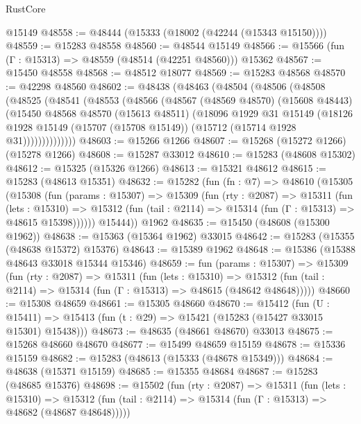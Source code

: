 \begin{lexlean}{RustCore}
\begin{coremodule}
    @15149
@48558 := @48444 (@15333 (@18002 (@42244 (@15343 @15150))))
@48559 := @15283 @48558
@48560 := @48544 @15149
@48566 := @15566 (fun (Γ : @15313) => @48559 (@48514 (@42251 @48560))) @15362
@48567 := @15450 @48558
@48568 := @48512 @18077
@48569 := @15283 @48568
@48570 := @42298 @48560
@48602 := @48438
    (@48463
      (@48504
        (@48506
          (@48508
            (@48525
              (@48541
                (@48553
                  (@48566
                    (@48567
                      (@48569 @48570)
                      (@15608 @48443)
                      (@15450
                        @48568
                        @48570
                        (@15613 @48511)
                        (@18096
                          @1929
                          @31
                          @15149
                          (@18126
                            @1928
                            @15149
                            (@15707 (@15708 @15149))
                            (@15712 (@15714 @1928 @31))))))))))))))
@48603 := @15266 @1266
@48607 := @15268 (@15272 @1266) (@15278 @1266)
@48608 := @15287 @33012
@48610 := @15283 (@48608 @15302)
@48612 := @15325 (@15326 @1266)
@48613 := @15321 @48612
@48615 := @15283 (@48613 @15351)
@48632 := @15282
    (fun (fn : @7) =>
    @48610
      (@15305
        (@15308
          (fun (params : @15307) =>
          @15309
            (fun (rty : @2087) =>
            @15311
              (fun (lets : @15310) =>
              @15312 (fun (tail : @2114) => @15314 (fun (Γ : @15313) => @48615 @15398))))))
        @15444))
    @1962
@48635 := @15450 (@48608 (@15300 @1962))
@48638 := @15363 (@15364 @1962) @33015
@48642 := @15283 (@15355 (@48638 @15372) @15376)
@48643 := @15389 @1962
@48648 := @15386 (@15388 @48643 @33018 @15344 @15346)
@48659 := fun (params : @15307) =>
  @15309
    (fun (rty : @2087) =>
    @15311
      (fun (lets : @15310) =>
      @15312 (fun (tail : @2114) => @15314 (fun (Γ : @15313) => @48615 (@48642 @48648)))))
@48660 := @15308 @48659
@48661 := @15305 @48660
@48670 := @15412
    (fun (U : @15411) => @15413 (fun (t : @29) => @15421 (@15283 (@15427 @33015 @15301) @15438)))
@48673 := @48635 (@48661 @48670) @33013
@48675 := @15268 @48660 @48670
@48677 := @15499 @48659 @15159
@48678 := @15336 @15159
@48682 := @15283 (@48613 (@15333 (@48678 @15349)))
@48684 := @48638 (@15371 @15159)
@48685 := @15355 @48684
@48687 := @15283 (@48685 @15376)
@48698 := @15502
    (fun (rty : @2087) =>
    @15311
      (fun (lets : @15310) =>
      @15312 (fun (tail : @2114) => @15314 (fun (Γ : @15313) => @48682 (@48687 @48648)))))

\end{coremodule}
\end{lexlean}
